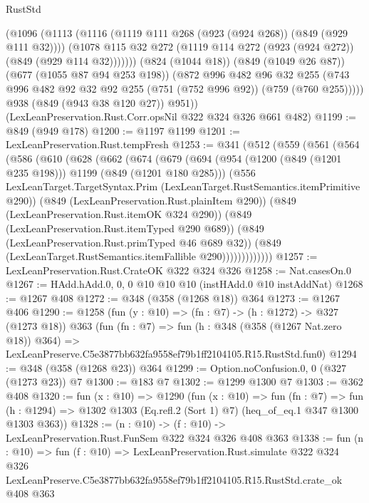 \begin{lexlean}{RustStd}
\begin{coremodule}
            (@1096
              (@1113
                (@1116 (@1119 @111 @268 (@923 (@924 @268)) (@849 (@929 @111 @32))))
                (@1078 @115 @32 @272 (@1119 @114 @272 (@923 (@924 @272)) (@849 (@929 @114 @32)))))))
          (@824 (@1044 @18))
          (@849 (@1049 @26 @87))
          (@677 (@1055 @87 @94 @253 @198))
          (@872
            @996
            @482
            @96
            @32
            @255
            (@743 @996 @482 @92 @32 @92 @255 (@751 (@752 @996 @92)) (@759 (@760 @255)))))
        @938
        (@849 (@943 @38 @120 @27))
        @951))
    (LexLeanPreservation.Rust.Corr.opsNil @322 @324 @326 @661 @482)
@1199 := @849 (@949 @178)
@1200 := @1197 @1199
@1201 := LexLeanPreservation.Rust.tempFresh
@1253 := @341
    (@512
      (@559
        (@561
          (@564
            (@586
              (@610
                (@628
                  (@662
                    (@674
                      (@679
                        (@694
                          (@954 (@1200 (@849 (@1201 @235 @198))) @1199 (@849 (@1201 @180 @285)))
                          (@556
                            LexLeanTarget.TargetSyntax.Prim
                            (LexLeanTarget.RustSemantics.itemPrimitive @290))
                          (@849 (LexLeanPreservation.Rust.plainItem @290))
                          (@849 (LexLeanPreservation.Rust.itemOK @324 @290))
                          (@849 (LexLeanPreservation.Rust.itemTyped @290 @689))
                          (@849 (LexLeanPreservation.Rust.primTyped @46 @689 @32))
                          (@849 (LexLeanTarget.RustSemantics.itemFallible @290)))))))))))))
@1257 := LexLeanPreservation.Rust.CrateOK @322 @324 @326
@1258 := Nat.casesOn.{0}
@1267 := HAdd.hAdd.{0, 0, 0} @10 @10 @10 (instHAdd.{0} @10 instAddNat)
@1268 := @1267 @408
@1272 := @348 (@358 (@1268 @18)) @364
@1273 := @1267 @406
@1290 := @1258
    (fun (y : @10) => (fn : @7) -> (h : @1272) -> @327 (@1273 @18))
    @363
    (fun (fn : @7) =>
    fun (h : @348 (@358 (@1267 Nat.zero @18)) @364) =>
    LexLeanPreserve.C5e3877bb632fa9558ef79b1ff2104105.R15.RustStd.fun0)
@1294 := @348 (@358 (@1268 @23)) @364
@1299 := Option.noConfusion.{0, 0} (@327 (@1273 @23)) @7
@1300 := @183 @7
@1302 := @1299 @1300 @7
@1303 := @362 @408
@1320 := fun (x : @10) =>
  @1290
    (fun (x : @10) =>
    fun (fn : @7) =>
    fun (h : @1294) => @1302 @1303 (Eq.refl.{2} (Sort 1) @7) (heq_of_eq.{1} @347 @1300 @1303 @363))
@1328 := (n : @10) -> (f : @10) -> LexLeanPreservation.Rust.FunSem @322 @324 @326 @408 @363
@1338 := fun (n : @10) =>
  fun (f : @10) =>
  LexLeanPreservation.Rust.simulate
    @322
    @324
    @326
    LexLeanPreserve.C5e3877bb632fa9558ef79b1ff2104105.R15.RustStd.crate_ok
    @408
    @363
\end{coremodule}
\end{lexlean}
